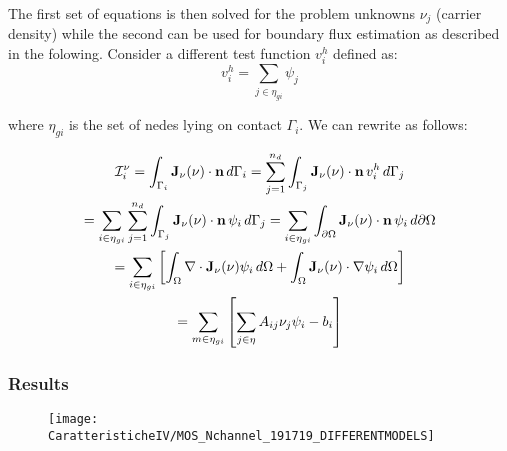 The first set of equations is then solved for the problem unknowns $\nu_j$ (carrier density) while the second can be used for boundary flux estimation as described in the folowing. Consider  a different test function $v^h_i$ defined as:
\begin{equation}
v^h_i=\sum_{j\in\eta_{gi} }\psi_j
\end{equation}

where $\eta_{gi}$ is the set of nedes lying on contact $\Gamma_i$. We can rewrite  as follows:

\begin{multline}
\mathcal{I}_i^\nu 
= \int_{\Gamma_i}\mathbf{J}_\nu(\nu) \cdot \mathbf{n} \, d{\Gamma_i}
= \sum_{j=1}^{n_d}\int_{\Gamma_j}\mathbf{J}_\nu(\nu) \cdot \mathbf{n} \,v_i^h \, d{\Gamma_j} \\
=\sum_{i\in\eta_{gi}}\sum_{j=1}^{n_d}\int_{\Gamma_j}\mathbf{J}_\nu(\nu) \cdot \mathbf{n} \, \psi_i \, d{\Gamma_j} 
= \sum_{i\in \eta_{gi}}\int_{\partial \Omega}\mathbf{J}_\nu(\nu) \cdot \mathbf{n} \, \psi_i \, d{\partial \Omega} \\
= \sum_{i\in \eta_{gi}} \left[ \int_{\Omega}\nabla \cdot \mathbf{J}_\nu(\nu) \psi_i \, d{\Omega} + \int_{\Omega}\mathbf{J}_\nu(\nu) \cdot \nabla\psi_i \, d{\Omega} \right] \\
= \sum_{m\in \eta_{gi}} \left[ \sum_{j\in\eta} A_{ij} \nu_j\psi_i - b_i  \right] \\
\end{multline}


\subsubsection{Results}

\begin{figure}[!h]
\texttt{[image: CaratteristicheIV/MOS\_Nchannel\_191719\_DIFFERENTMODELS]}
\end{figure}

\clearpage 

